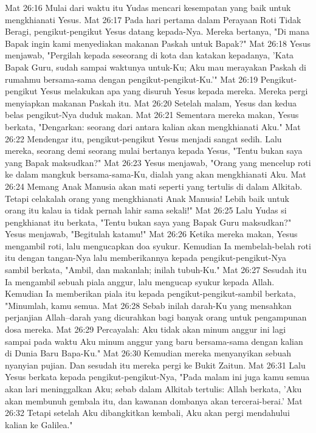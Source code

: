 Mat 26:16  Mulai dari waktu itu Yudas mencari kesempatan yang baik untuk mengkhianati Yesus.
Mat 26:17  Pada hari pertama dalam Perayaan Roti Tidak Beragi, pengikut-pengikut Yesus datang kepada-Nya. Mereka bertanya, "Di mana Bapak ingin kami menyediakan makanan Paskah untuk Bapak?"
Mat 26:18  Yesus menjawab, "Pergilah kepada seseorang di kota dan katakan kepadanya, 'Kata Bapak Guru, sudah sampai waktunya untuk-Ku; Aku mau merayakan Paskah di rumahmu bersama-sama dengan pengikut-pengikut-Ku.'"
Mat 26:19  Pengikut-pengikut Yesus melakukan apa yang disuruh Yesus kepada mereka. Mereka pergi menyiapkan makanan Paskah itu.
Mat 26:20  Setelah malam, Yesus dan kedua belas pengikut-Nya duduk makan.
Mat 26:21  Sementara mereka makan, Yesus berkata, "Dengarkan: seorang dari antara kalian akan mengkhianati Aku."
Mat 26:22  Mendengar itu, pengikut-pengikut Yesus menjadi sangat sedih. Lalu mereka, seorang demi seorang mulai bertanya kepada Yesus, "Tentu bukan saya yang Bapak maksudkan?"
Mat 26:23  Yesus menjawab, "Orang yang mencelup roti ke dalam mangkuk bersama-sama-Ku, dialah yang akan mengkhianati Aku.
Mat 26:24  Memang Anak Manusia akan mati seperti yang tertulis di dalam Alkitab. Tetapi celakalah orang yang mengkhianati Anak Manusia! Lebih baik untuk orang itu kalau ia tidak pernah lahir sama sekali!"
Mat 26:25  Lalu Yudas si pengkhianat itu berkata, "Tentu bukan saya yang Bapak Guru maksudkan?" Yesus menjawab, "Begitulah katamu!"
Mat 26:26  Ketika mereka makan, Yesus mengambil roti, lalu mengucapkan doa syukur. Kemudian Ia membelah-belah roti itu dengan tangan-Nya lalu memberikannya kepada pengikut-pengikut-Nya sambil berkata, "Ambil, dan makanlah; inilah tubuh-Ku."
Mat 26:27  Sesudah itu Ia mengambil sebuah piala anggur, lalu mengucap syukur kepada Allah. Kemudian Ia memberikan piala itu kepada pengikut-pengikut-sambil berkata, "Minumlah, kamu semua.
Mat 26:28  Sebab inilah darah-Ku yang mensahkan perjanjian Allah--darah yang dicurahkan bagi banyak orang untuk pengampunan dosa mereka.
Mat 26:29  Percayalah: Aku tidak akan minum anggur ini lagi sampai pada waktu Aku minum anggur yang baru bersama-sama dengan kalian di Dunia Baru Bapa-Ku."
Mat 26:30  Kemudian mereka menyanyikan sebuah nyanyian pujian. Dan sesudah itu mereka pergi ke Bukit Zaitun.
Mat 26:31  Lalu Yesus berkata kepada pengikut-pengikut-Nya, "Pada malam ini juga kamu semua akan lari meninggalkan Aku; sebab dalam Alkitab tertulis: Allah berkata, 'Aku akan membunuh gembala itu, dan kawanan dombanya akan tercerai-berai.'
Mat 26:32  Tetapi setelah Aku dibangkitkan kembali, Aku akan pergi mendahului kalian ke Galilea."
